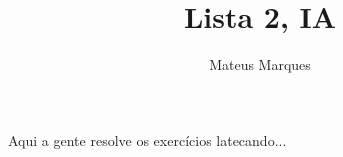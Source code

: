 \documentclass[a4paper,fleqn,12pt]{article}
\title{\Huge{\textbf{Lista 2, IA}}}
\author{Mateus Marques}
\begin{document}
\maketitle

Aqui a gente resolve os exercícios latecando...
\end{document}
